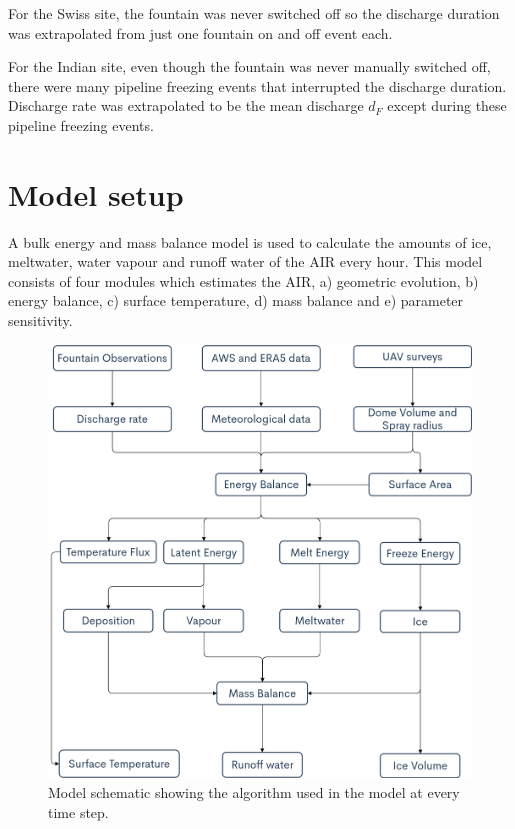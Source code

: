 \documentclass[utf8]{frontiersSCNS} %
\begin{document}
For the Swiss site, the fountain was never switched off so the discharge duration was extrapolated from just one
fountain on and off event each.

For the Indian site, even though the fountain was never manually switched off, there were many pipeline freezing events
that interrupted the discharge duration. Discharge rate was extrapolated to be the mean discharge $d_F$ except during
these pipeline freezing events.

\section{Model setup}

A bulk energy and mass balance model is used to calculate the amounts of ice, meltwater, water vapour and runoff water
of the AIR every hour. This model consists of four modules which estimates the AIR, a) geometric evolution, b) energy
balance, c) surface temperature, d) mass balance and e) parameter sensitivity.

\begin{figure} \begin{center} \includegraphics[width=12 cm]{Figures/model_schematic.png} \end{center} \caption{Model
		schematic showing the algorithm used in the model at every time step. } \label{fig:schema} \end{figure}
\end{document}
